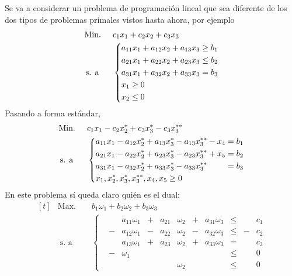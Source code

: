 \documentclass[11pt]{report}
\theoremstyle{mytheorem}
\theoremstyle{mydefinition}
\theoremstyle{myexample}
\begin{document}
Se va a considerar un problema de programación lineal que sea diferente de los dos tipos de problemas primales vistos hasta ahora, por ejemplo
\[\begin{aligned}[t]
&\text{Min. } && c_1x_1+c_2x_2+c_3x_3 \\
& \, \text{s. a} &&\left\{\begin{alignedat}{10}
&a_{11}x_1+a_{12}x_2+a_{13}x_3 \geq b_1 \\
&a_{21}x_1+a_{22}x_2+a_{23}x_3 \leq b_2 \\
&a_{31}x_1+a_{32}x_2+a_{33}x_3 = b_3 \\
&\mathrlap{x_1 \geq 0} \\
&\mathrlap{x_2 \leq 0}
\end{alignedat}\right.
\end{aligned}\]
Pasando a forma estándar,
\[\begin{aligned}[t]
&\text{Min. } && c_1x_1-c_2x_2^*+c_3x_3^*-c_3x_3^{**} \\
& \, \text{s. a} &&\left\{\begin{alignedat}{10}
&a_{11}x_1-a_{12}x_2^*+a_{13}x_3^*-a_{13}x_3^{**}-x_4 & {}={} b_1 \\
&a_{21}x_1-a_{22}x_2^*+a_{23}x_3^*-a_{23}x_3^{**}+x_5 & {}={} b_2 \\
&a_{31}x_1-a_{32}x_2^*+a_{33}x_3^*-a_{33}x_3^{**}     & {}={} b_3 \\
&\mathrlap{x_1,x_2^*,x_3^*,x_3^{**},x_4,x_5\geq0} \\
\end{alignedat}\right.
\end{aligned}\]
En este problema sí queda claro quién es el dual:
\[\begin{aligned}[t]
&\text{Max. } && b_1\omega_1+b_2\omega_2+b_3\omega_3 \\
& \; \text{s. a} &&\left\{\begin{alignedat}{10}
& &a_{11}\omega_1 & {}+{} & a_{21}&\omega_2 & {}+{} & a_{31}\omega_3 & {}\leq{} &  &c_1 \\
&-&a_{12}\omega_1 & {}-{} & a_{22}&\omega_2 & {}-{} & a_{32}\omega_3 & {}\leq{} & -&c_2  \\
& &a_{13}\omega_1 & {}+{} & a_{23}&\omega_2 & {}+{} & a_{33}\omega_3 & {}={}    &  &c_3 \\
&-&\omega_1       &       &       &         &       &                & {}\leq{} &  &0 \\
& &               &       &       &\omega_2 &       &                & {}\leq{} &  &0
\end{alignedat}\right.
\end{aligned}\]
\end{document}
